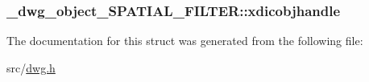 \hypertarget{struct__dwg__object__SPATIAL__FILTER_aeece031f9b8c3e67397d3be7667ebe19}{
\subsubsection[{xdicobjhandle}]{ {\bf \-\_\-dwg\-\_\-object\-\_\-\-S\-P\-A\-T\-I\-A\-L\-\_\-\-F\-I\-L\-T\-E\-R\-::xdicobjhandle}}}\label{struct__dwg__object__SPATIAL__FILTER_aeece031f9b8c3e67397d3be7667ebe19}


\-The documentation for this struct was generated from the following file\-:\begin{DoxyCompactItemize}
\item 
src/\hyperlink{dwg_8h}{dwg.\-h}\end{DoxyCompactItemize}

